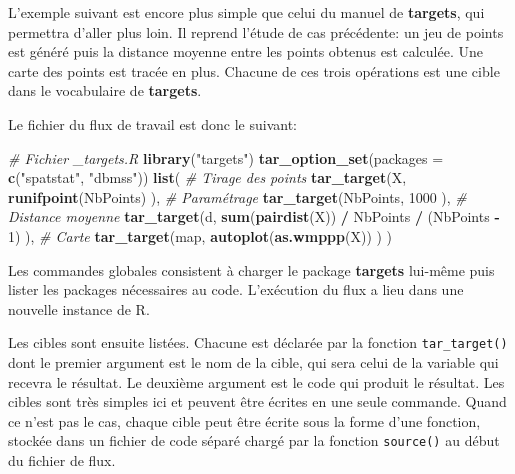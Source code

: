 \documentclass[
  12pt,
  french,
  a4paper,
  extrafontsizes,onecolumn,openright
  ]{memoir}
\newenvironment{Shaded}{\begin{snugshade}}{\end{snugshade}}
\newcommand{\AttributeTok}[1]{\textcolor[rgb]{0.13,0.29,0.53}{#1}}
\newcommand{\CommentTok}[1]{\textcolor[rgb]{0.56,0.35,0.01}{\textit{#1}}}
\newcommand{\DecValTok}[1]{\textcolor[rgb]{0.00,0.00,0.81}{#1}}
\newcommand{\FunctionTok}[1]{\textcolor[rgb]{0.13,0.29,0.53}{\textbf{#1}}}
\newcommand{\NormalTok}[1]{#1}
\newcommand{\SpecialCharTok}[1]{\textcolor[rgb]{0.81,0.36,0.00}{\textbf{#1}}}
\newcommand{\StringTok}[1]{\textcolor[rgb]{0.31,0.60,0.02}{#1}}
\begin{document}
L'exemple suivant est encore plus simple que celui du manuel de \textbf{targets}, qui permettra d'aller plus loin.
Il reprend l'étude de cas précédente: un jeu de points est généré puis la distance moyenne entre les points obtenus est calculée.
Une carte des points est tracée en plus.
Chacune de ces trois opérations est une cible dans le vocabulaire de \textbf{targets}.

Le fichier du flux de travail est donc le suivant:

\scriptsize

\begin{Shaded}
\begin{Highlighting}[]
\CommentTok{\# Fichier \_targets.R }
\FunctionTok{library}\NormalTok{(}\StringTok{"targets"}\NormalTok{)}
\FunctionTok{tar\_option\_set}\NormalTok{(}\AttributeTok{packages =} \FunctionTok{c}\NormalTok{(}\StringTok{"spatstat"}\NormalTok{, }\StringTok{"dbmss"}\NormalTok{))}
\FunctionTok{list}\NormalTok{(}
  \CommentTok{\# Tirage des points}
  \FunctionTok{tar\_target}\NormalTok{(X,}
    \FunctionTok{runifpoint}\NormalTok{(NbPoints)}
\NormalTok{  ),}
  \CommentTok{\# Paramétrage}
  \FunctionTok{tar\_target}\NormalTok{(NbPoints,}
    \DecValTok{1000}
\NormalTok{  ),}
  \CommentTok{\# Distance moyenne}
  \FunctionTok{tar\_target}\NormalTok{(d,}
    \FunctionTok{sum}\NormalTok{(}\FunctionTok{pairdist}\NormalTok{(X)) }\SpecialCharTok{/}\NormalTok{ NbPoints }\SpecialCharTok{/}\NormalTok{ (NbPoints }\SpecialCharTok{{-}} \DecValTok{1}\NormalTok{)}
\NormalTok{  ),}
  \CommentTok{\# Carte}
  \FunctionTok{tar\_target}\NormalTok{(map, }
    \FunctionTok{autoplot}\NormalTok{(}\FunctionTok{as.wmppp}\NormalTok{(X))}
\NormalTok{  )}
\NormalTok{)}
\end{Highlighting}
\end{Shaded}

\normalsize

Les commandes globales consistent à charger le package \textbf{targets} lui-même puis lister les packages nécessaires au code.
L'exécution du flux a lieu dans une nouvelle instance de R.

Les cibles sont ensuite listées.
Chacune est déclarée par la fonction \texttt{tar\_target()} dont le premier argument est le nom de la cible, qui sera celui de la variable qui recevra le résultat.
Le deuxième argument est le code qui produit le résultat.
Les cibles sont très simples ici et peuvent être écrites en une seule commande.
Quand ce n'est pas le cas, chaque cible peut être écrite sous la forme d'une fonction, stockée dans un fichier de code séparé chargé par la fonction \texttt{source()} au début du fichier de flux.
\end{document}
